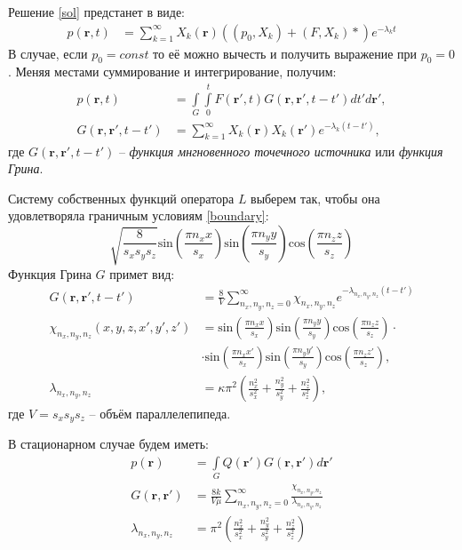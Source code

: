 	Решение \eqref{sol} предстанет в виде:
\begin{align}
	\label{sol1}
	p\left(\boldsymbol{r}, t\right) &= \sum_{k=1}^\infty X_k(\boldsymbol{r}) \left(\left(p_0, X_k\right) + \left(F, X_k\right) \ast\right) e^{-\lambda_k t}
\end{align}
	В случае, если $p_0 = const$ то её можно вычесть и получить выражение при $p_0=0$. Меняя местами суммирование и интегрирование, получим:
\begin{align}
	\label{sol2}
	p\left(\boldsymbol{r}, t\right) &= \int\limits_G \int\limits_0^t F\left(\boldsymbol{r}', t\right) G(\boldsymbol{r},\boldsymbol{r}', t-t') dt' d\boldsymbol{r'},\\
	G(\boldsymbol{r},\boldsymbol{r}', t-t') &= \sum_{k=1}^\infty X_k(\boldsymbol{r}) X_k(\boldsymbol{r}') e^{-\lambda_k(t-t')},
\end{align}
	где $G(\boldsymbol{r}, \boldsymbol{r}', t-t')$ -- \textit{функция мнгновенного точечного источника} или \textit{функция Грина}.
	
	Систему собственных функций оператора $L$ выберем так, чтобы она удовлетворяла граничным условиям \eqref{boundary}:
\begin{equation}
	\label{eigenfuncs}
	\sqrt{\frac{8}{s_x s_y s_z}}\text{sin}\left(\frac{\pi n_x x}{s_x}\right)\text{sin}\left(\frac{\pi n_y y}{s_y}\right)\text{cos}\left(\frac{\pi n_z z}{s_z}\right)
\end{equation}
	Функция Грина $G$ примет вид:
\begin{align}
	\label{green}
	G(\boldsymbol{r},\boldsymbol{r}', t-t') &= \frac{8}{V}\sum_{n_x, n_y, n_z = 0}^\infty \chi_{n_x, n_y, n_z} e^{-\lambda_{n_x, n_y, n_z}(t-t')}\\
	 \chi_{n_x, n_y, n_z}(x, y, z, x', y', z') &= \text{sin}\left(\frac{\pi n_x x}{s_x}\right)\text{sin}\left(\frac{\pi n_y y}{s_y}\right)\text{cos}\left(\frac{\pi n_z z}{s_z}\right) \cdot \nonumber\\
	&\cdot\text{sin}\left(\frac{\pi n_x x'}{s_x}\right)\text{sin}\left(\frac{\pi n_y y'}{s_y}\right)\text{cos}\left(\frac{\pi n_z z'}{s_z}\right), \nonumber\\
	 \lambda_{n_x, n_y, n_z} &= \kappa \pi^2 \left(\frac{n_x^2}{s_x^2}+\frac{n_y^2}{s_y^2}+\frac{n_z^2}{s_z^2}\right),
\end{align}	
	где $V = s_x s_y s_z$ -- объём параллелепипеда.
	
	В стационарном случае будем иметь:
\begin{align}
	\label{sol_st}
	p\left(\boldsymbol{r}\right) &= \int\limits_G Q\left(\boldsymbol{r}'\right) G(\boldsymbol{r},\boldsymbol{r}') d\boldsymbol{r'} \\
	G(\boldsymbol{r}, \boldsymbol{r}') &= \frac{8k}{V\mu}\sum_{n_x, n_y, n_z = 0}^\infty \frac{\chi_{n_x, n_y, n_z}}{\lambda_{n_x, n_y, n_z}}\nonumber\\
	\lambda_{n_x, n_y, n_z} &= \pi^2\left(\frac{n_x^2}{s_x^2}+\frac{n_y^2}{s_y^2}+\frac{n_z^2}{s_z^2}\right)\nonumber
\end{align}


